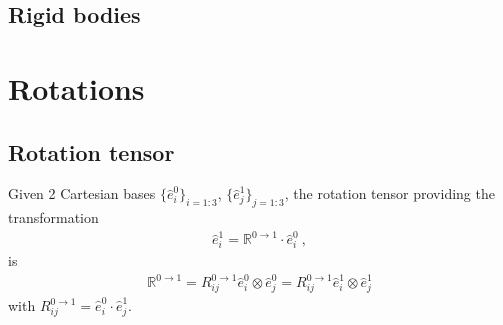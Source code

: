 \documentclass[letterpaper,10pt,english]{jupyterBook}
\begin{document}
\subsection{Rigid bodies}
\label{\detokenize{ch/kinematics-relative:rigid-bodies}}
\sphinxAtStartPar
{}

\sphinxAtStartPar
{}

\sphinxAtStartPar
{}

\sphinxstepscope


\section{Rotations}
\label{\detokenize{ch/kinematics-rotations:rotations}}\label{\detokenize{ch/kinematics-rotations:classical-mechanics-kinematics-rotations}}\label{\detokenize{ch/kinematics-rotations::doc}}

\subsection{Rotation tensor}
\label{\detokenize{ch/kinematics-rotations:rotation-tensor}}
\sphinxAtStartPar
Given 2 Cartesian bases \(\{ \hat{e}^0_i \}_{i=1:3}\), \(\{ \hat{e}^1_j \}_{j=1:3}\), the rotation tensor providing the transformation
\begin{equation*}
\begin{split}\hat{e}^1_i = \mathbb{R}^{0 \rightarrow 1} \cdot \hat{e}^0_i \ ,\end{split}
\end{equation*}
\sphinxAtStartPar
is
\begin{equation*}
\begin{split}\mathbb{R}^{0 \rightarrow 1}
 = R_{ij}^{0 \rightarrow 1} \hat{e}^0_i \otimes \hat{e}^0_j  
 = R_{ij}^{0 \rightarrow 1} \hat{e}^1_i \otimes \hat{e}^1_j 
\end{split}
\end{equation*}
\sphinxAtStartPar
with \(R^{0 \rightarrow 1}_{ij} = \hat{e}^0_i \cdot \hat{e}^1_j\).
\end{document}
